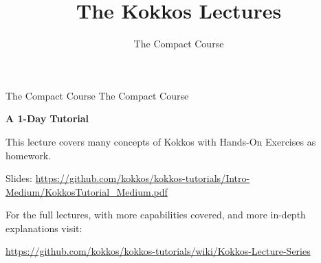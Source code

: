 

\title{The Kokkos Lectures}

\author{The Compact Course}




\shorttrue
\mediumtrue
\fullfalse




\begin{frame}
	\titlepage
\end{frame}

\begin{frame}{The Compact Course}
	{\huge The Compact Course}

	\textbf{A 1-Day Tutorial}

	\vspace{10pt}
	This lecture covers many concepts of Kokkos with Hands-On Exercises as homework.

	Slides: \url{https://github.com/kokkos/kokkos-tutorials/Intro-Medium/KokkosTutorial_Medium.pdf}

	\vspace{20pt}
	For the full lectures, with more capabilities covered, and more in-depth explanations visit:

	\url{https://github.com/kokkos/kokkos-tutorials/wiki/Kokkos-Lecture-Series}
\end{frame}



